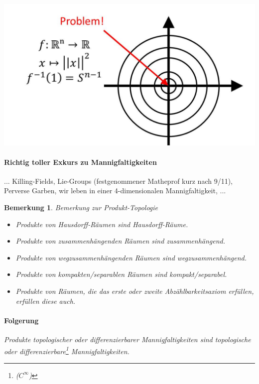 \documentclass[a4paper,11pt,notitlepage]{report}
\newtheorem{remark}{Bemerkung}[chapter]
\begin{document}
\includegraphics[scale=0.4]{images/Norm_invers.jpg}


\paragraph{Richtig toller Exkurs zu Mannigfaltigkeiten}... Killing-Fields, Lie-Groups (festgenommener Matheprof kurz nach 9/11), Perverse Garben, wir leben in einer 4-dimensionalen Mannigfaltigkeit, ...

\newpage
\begin{remark}{Bemerkung zur Produkt-Topologie}
\begin{itemize}
	\item Produkte von Hausdorff-Räumen sind Hausdorff-Räume.
	\item Produkte von zusammenhängenden Räumen sind zusammenhängend.
	\item Produkte von wegzusammenhängenden Räumen sind wegzusammenhängend.
	\item Produkte von kompakten/separablen Räumen sind kompakt/separabel.
	\item Produkte von Räumen, die das erste oder zweite Abzählbarkeitsaxiom erfüllen, erfüllen diese auch.
\end{itemize}
 
\paragraph{Folgerung}
	Produkte topologischer oder differenzierbarer Mannigfaltigkeiten sind topologische oder differenzierbare\footnote{($C^\infty$)} Mannigfaltigkeiten.
\end{remark}
 
\end{document}

